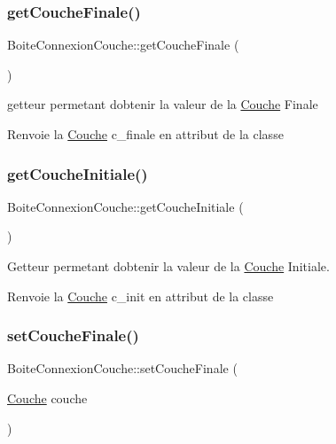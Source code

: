 \subsubsection{\texorpdfstring{get\+Couche\+Finale()}{getCoucheFinale()}}
{\footnotesize\ttfamily Boite\+Connexion\+Couche\+::get\+Couche\+Finale (\begin{DoxyParamCaption}{ }\end{DoxyParamCaption})}



getteur permetant d\textquotesingle{}obtenir la valeur de la \hyperlink{classCouche}{Couche} Finale 

\begin{DoxyReturn}{Renvoie}
la \hyperlink{classCouche}{Couche} c\+\_\+finale en attribut de la classe 
\end{DoxyReturn}
\mbox{\label{classBoiteConnexionCouche_a3b0faf67baf198a1abaafc7c469fc6d2}} 
\subsubsection{\texorpdfstring{get\+Couche\+Initiale()}{getCoucheInitiale()}}
{\footnotesize\ttfamily Boite\+Connexion\+Couche\+::get\+Couche\+Initiale (\begin{DoxyParamCaption}{ }\end{DoxyParamCaption})}



Getteur permetant d\textquotesingle{}obtenir la valeur de la \hyperlink{classCouche}{Couche} Initiale. 

\begin{DoxyReturn}{Renvoie}
la \hyperlink{classCouche}{Couche} c\+\_\+init en attribut de la classe 
\end{DoxyReturn}
\mbox{\label{classBoiteConnexionCouche_a9469138a3db603eddacf8757595ad6cf}} 
\subsubsection{\texorpdfstring{set\+Couche\+Finale()}{setCoucheFinale()}}
{\footnotesize\ttfamily Boite\+Connexion\+Couche\+::set\+Couche\+Finale (\begin{DoxyParamCaption}\item[{\hyperlink{classCouche}{Couche}}]{couche }\end{DoxyParamCaption})}




